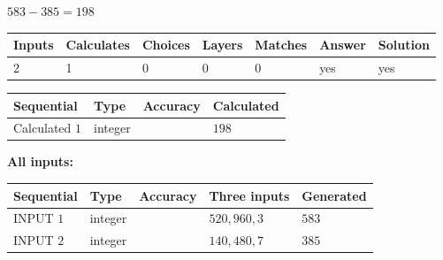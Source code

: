 \documentclass{ctexart}
\begin{document}
 

$ %
583 -  %
385=   %
198$
 
 
\noindent{}
 
 

 
   
   
   
   
\noindent\begin{tabular}{|l|l|l|l|l|l|l|}
 \hline
Inputs & Calculates & Choices & Layers & Matches & Answer & Solution \\ \hline
 2  & 
 1  & 
 0
  & 
 0  & 
 0  & 
  yes & 
  yes 
  \\ \hline
 \end{tabular}
   
   
   
   
\noindent{}
   
   
  
  
\noindent\begin{tabular}{|l|l|l|l|}
\hline
 Sequential & Type & Accuracy & Calculated \\ 
\hline
 
 
  Calculated $  1 $ & integer &  & 
  $ 198 $ 
 \\  \hline  
 \end{tabular}
   
   
   
   
\noindent\vspace{0.1in}\hspace{-0.08in} {\textbf{\Large{All inputs: }}}
   
   
  
  
\noindent\begin{tabular}{|l|l|l|l|l|}
\hline
 Sequential & Type & Accuracy & Three inputs & Generated \\ 
\hline
 
 
  INPUT $  1 $ & integer &  & $
 520
 , 
 960
 , 
 3
 $ & $ 583 $ 
 \\  \hline  
 
 
  INPUT $  2 $ & integer &  & $
 140
 , 
 480
 , 
 7
 $ & $ 385 $ 
 \\  \hline  
 \end{tabular}
   
   
   
   
   
   
 \vspace{0.2in}
 
\end{document}
